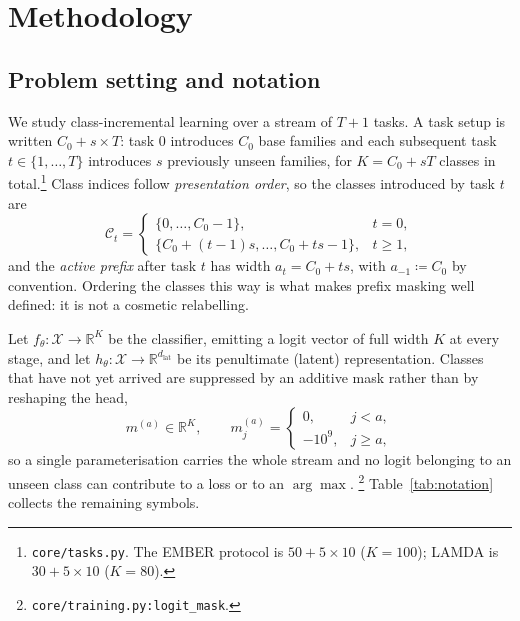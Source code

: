 %
%   
%
%

\section{Methodology}
\label{sec:method}

\subsection{Problem setting and notation}
\label{sec:method:notation}

We study class-incremental learning over a stream of $T{+}1$ tasks. A task
setup is written $C_0 + s \times T$: task $0$ introduces $C_0$ base families and
each subsequent task $t \in \{1,\dots,T\}$ introduces $s$ previously unseen
families, for $K = C_0 + sT$ classes in total.\footnote{\texttt{core/tasks.py}.
The EMBER protocol is $50+5\times10$ ($K=100$); LAMDA is $30+5\times10$
($K=80$).} Class indices follow \emph{presentation order}, so the classes
introduced by task $t$ are
\begin{equation}
  \mathcal{C}_t =
  \begin{cases}
    \{0,\dots,C_0-1\}, & t = 0,\\[2pt]
    \{C_0 + (t-1)s, \dots, C_0 + ts - 1\}, & t \ge 1,
  \end{cases}
\end{equation}
and the \emph{active prefix} after task $t$ has width $a_t = C_0 + ts$, with
$a_{-1} \coloneqq C_0$ by convention. Ordering the classes this way is what makes
prefix masking well defined: it is not a cosmetic relabelling.

Let $f_\theta : \mathcal{X} \to \mathbb{R}^{K}$ be the classifier, emitting a
logit vector of full width $K$ at every stage, and let
$h_\theta : \mathcal{X} \to \mathbb{R}^{d_{\text{lat}}}$ be its penultimate
(latent) representation. Classes that have not yet arrived are suppressed by an
additive mask rather than by reshaping the head,
\begin{equation}
  \label{eq:mask}
  m^{(a)} \in \mathbb{R}^{K}, \qquad
  m^{(a)}_j = \begin{cases} 0, & j < a, \\ -10^{9}, & j \ge a, \end{cases}
\end{equation}
so a single parameterisation carries the whole stream and no logit belonging to
an unseen class can contribute to a loss or to an $\arg\max$.%
\footnote{\texttt{core/training.py:logit\_mask}.}
Table~\ref{tab:notation} collects the remaining symbols.

